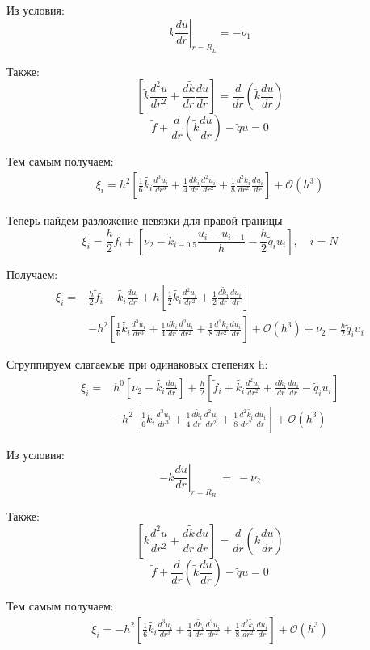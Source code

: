 Из условия:
\[
  k \left. \frac{du}{dr}\right\vert_{r = R_L} = -\nu _1
\]

Также:
\[
  \left [ \tilde{k} \frac{d^2u}{dr^2} + \frac{d\tilde{k}}{dr}\frac{du}{dr} \right ] =
  \frac{d}{dr}\left ( \tilde{k} \frac{du}{dr} \right )
\]
\[
  \tilde{f} + \frac{d}{dr}\left ( \tilde{k} \frac{du}{dr} \right ) - \tilde{q}u = 0
\]

Тем самым получаем:
\begin{align*}
  \xi_i = h^2 \left [ \frac{1}{6}\tilde{k_i} \frac{d^3 u_i}{d r^3} + \frac{1}{4}\frac{d \tilde{k}_i}{dr} \frac{d^2 u_i}{d r^2} + \frac{1}{8}\frac{d^2 \tilde{k_i}}{dr^2} \frac{d u_i}{d r} \right ] + \mathcal{O}(h^3)
\end{align*}

Теперь найдем разложение невязки для правой границы
\[
  \xi_i = \frac{h}{2} \tilde{f}_i + \left [ \nu_2 - \tilde{k}_{i-0.5}\frac{u_{i} - u_{i-1}}{h} - \frac{h}{2} \tilde{q}_i u_i \right ], \quad i = N
\]

Получаем:
\begin{align*}
  \xi_i = &\frac{h}{2} \tilde{f}_i - \tilde{k_i} \frac{du_i}{dr} + h \left [ \frac{1}{2}\tilde{k_i} \frac{d^2 u_i}{d r^2} + \frac{1}{2}\frac{d \tilde{k}_i}{dr} \frac{d u_i}{d r} \right ] \\
  &- h^2 \left [ \frac{1}{6}\tilde{k_i} \frac{d^3 u_i}{d r^3} + \frac{1}{4}\frac{d \tilde{k}_i}{dr} \frac{d^2 u_i}{d r^2} + \frac{1}{8}\frac{d^2 \tilde{k_i}}{dr^2} \frac{d u_i}{d r} \right ]
  + \mathcal{O}(h^3) + \nu_2 - \frac{h}{2} \tilde{q}_i u_i
\end{align*}

Сгруппируем слагаемые при одинаковых степенях h:
\begin{align*}
  \xi_i = &h^0 \left[ \nu_2 - \tilde{k_i} \frac{du_i}{dr} \right] + \frac{h}{2} \left[ \tilde{f}_i + \tilde{k_i} \frac{d^2 u_i}{d r^2} + \frac{d \tilde{k}_i}{dr} \frac{d u_i}{d r} - \tilde{q}_i u_i\right] \\
  &- h^2 \left [ \frac{1}{6}\tilde{k_i} \frac{d^3 u_i}{d r^3} + \frac{1}{4}\frac{d \tilde{k}_i}{dr} \frac{d^2 u_i}{d r^2} + \frac{1}{8}\frac{d^2 \tilde{k_i}}{dr^2} \frac{d u_i}{d r} \right ] + \mathcal{O}(h^3)
\end{align*}

Из условия:
\[
  -k \left. \frac{du}{dr}\right\vert_{r = R_R}\ =\ -\nu_2
\]

Также:
\[
  \left [ \tilde{k} \frac{d^2u}{dr^2} + \frac{d\tilde{k}}{dr}\frac{du}{dr} \right ] =
  \frac{d}{dr}\left ( \tilde{k} \frac{du}{dr} \right )
\]
\[
  \tilde{f} + \frac{d}{dr}\left ( \tilde{k} \frac{du}{dr} \right ) - \tilde{q}u = 0
\]

Тем самым получаем:
\begin{align*}
  \xi_i = - h^2 \left [ \frac{1}{6}\tilde{k_i} \frac{d^3 u_i}{d r^3} + \frac{1}{4}\frac{d \tilde{k}_i}{dr} \frac{d^2 u_i}{d r^2} + \frac{1}{8}\frac{d^2 \tilde{k_i}}{dr^2} \frac{d u_i}{d r} \right ] + \mathcal{O}(h^3)
\end{align*}